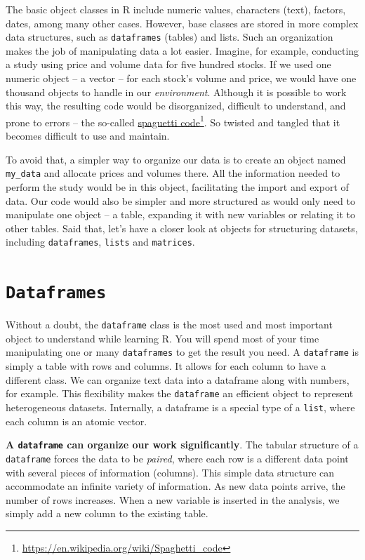 \documentclass[
  12pt,
]{book}
\begin{document}
The basic object classes in R include numeric values, characters (text), factors, dates, among many other cases. However, base classes are stored in more complex data structures, such as \texttt{dataframes} (tables) and lists. Such an organization makes the job of manipulating data a lot easier. Imagine, for example, conducting a study using price and volume data for five hundred stocks. If we used one numeric object -- a vector -- for each stock's volume and price, we would have one thousand objects to handle in our \emph{environment}. Although it is possible to work this way, the resulting code would be disorganized, difficult to understand, and prone to errors -- the so-called \href{https://en.wikipedia.org/wiki/Spaghetti_code}{spaguetti code}\footnote{\url{https://en.wikipedia.org/wiki/Spaghetti_code}}. So twisted and tangled that it becomes difficult to use and maintain.

To avoid that, a simpler way to organize our data is to create an object named \texttt{my\_data} and allocate prices and volumes there. All the information needed to perform the study would be in this object, facilitating the import and export of data. Our code would also be simpler and more structured as would only need to manipulate one object -- a table, expanding it with new variables or relating it to other tables. Said that, let's have a closer look at objects for structuring datasets, including \texttt{dataframes}, \texttt{lists} and \texttt{matrices}.

\hypertarget{dataframes}{%
\section{\texorpdfstring{\texttt{Dataframes}}{Dataframes}}\label{dataframes}}

Without a doubt, the \texttt{dataframe} class is the most used and most important object to understand while learning R. You will spend most of your time manipulating one or many \texttt{dataframes} to get the result you need. A \texttt{dataframe} is simply a table with rows and columns. It allows for each column to have a different class. We can organize text data into a dataframe along with numbers, for example. This flexibility makes the \texttt{dataframe} an efficient object to represent heterogeneous datasets. Internally, a dataframe is a special type of a \texttt{list}, where each column is an atomic vector. 

\textbf{A \texttt{dataframe} can organize our work significantly}. The tabular structure of a \texttt{dataframe} forces the data to be \emph{paired}, where each row is a different data point with several pieces of information (columns). This simple data structure can accommodate an infinite variety of information. As new data points arrive, the number of rows increases. When a new variable is inserted in the analysis, we simply add a new column to the existing table.
\end{document}
